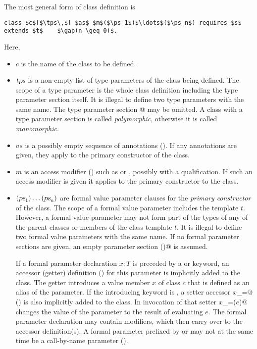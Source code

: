 The most general form of class definition is 
\begin{lstlisting}
class $c$[$\tps\,$] $as$ $m$($\ps_1$)$\ldots$($\ps_n$) requires $s$ extends $t$    $\gap(n \geq 0)$.
\end{lstlisting}
Here,
\begin{itemize}
\item[]
$c$ is the name of the class to be defined.
\item[] $\mbox{\sl tps}$ is a non-empty list of type parameters of the class
being defined.  The scope of a type parameter is the whole class
definition including the type parameter section itself.  It is
illegal to define two type parameters with the same name.  The type
parameter section \lstinline@[$\tps\,$]@ may be omitted. A class with a type
parameter section is called {\em polymorphic}, otherwise it is called
{\em monomorphic}.
\item[] $as$ is a possibly empty sequence of annotations
  (). If any annotations are given, 
they apply to the primary constructor of the class.
\item[] $m$ is an access modifier () such as
 or , possibly with a qualification.  If
such an access modifier is given it applies to the primary constructor
to the class.
\item[] 
$(\mbox{\sl ps}_1)\ldots(\mbox{\sl ps}_n)$ are formal value parameter clauses for the {\em primary
constructor} of the class. The scope of a formal value parameter includes
the template $t$. However, a formal value parameter may not form 
part of the types of any of the parent classes or members of the class
template $t$.
It is illegal to define two formal value parameters with the same name.
If no formal parameter sections are given, 
an empty parameter section \lstinline@()@ is assumed.

If a formal parameter declaration $x: T$ is preceded by a 
or  keyword, an accessor (getter) definition
() for this parameter is implicitly added to the
class. The getter introduces a value member $x$ of class $c$ that is
defined as an alias of the parameter. If the introducing keyword is
, a setter accessor \lstinline@$x$_=@ () is also
implicitly added to the class. In invocation of that setter \lstinline@$x$_=($e$)@
changes the value of the parameter to the result of evaluating $e$.
The formal parameter declaration may contain modifiers, which then
carry over to the accessor definition(s). A formal parameter prefixed
by  or  may not at the same time be a call-by-name
parameter ().


\end{itemize}
